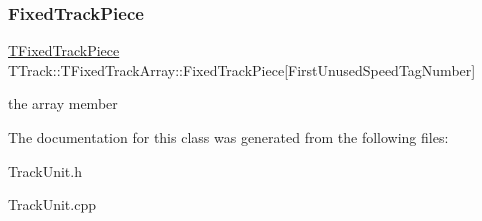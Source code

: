 \subsubsection{\texorpdfstring{Fixed\+Track\+Piece}{FixedTrackPiece}}
{\footnotesize\ttfamily \mbox{\hyperlink{class_t_fixed_track_piece}{T\+Fixed\+Track\+Piece}} T\+Track\+::\+T\+Fixed\+Track\+Array\+::\+Fixed\+Track\+Piece\mbox{[}First\+Unused\+Speed\+Tag\+Number\mbox{]}}

the array member 

The documentation for this class was generated from the following files\+:\begin{DoxyCompactItemize}
\item 
Track\+Unit.\+h\item 
Track\+Unit.\+cpp\end{DoxyCompactItemize}
